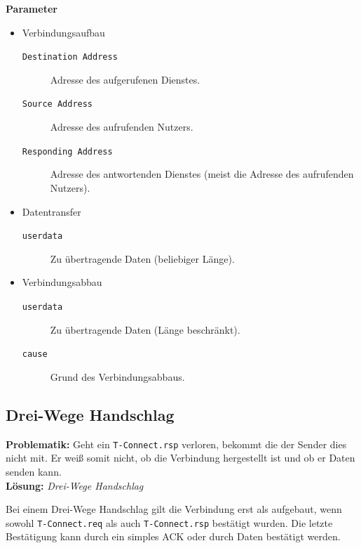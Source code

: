 \documentclass[a4paper, 11pt, accentcolor = tud3b]{tudreport}
\begin{document}
	            \textbf{Parameter}
	            \begin{itemize}
	            	\item Verbindungsaufbau
		            	\begin{description}
		            		\item[\texttt{Destination Address}] Adresse des aufgerufenen Dienstes.
		            		\item[\texttt{Source Address}] Adresse des aufrufenden Nutzers.
		            		\item[\texttt{Responding Address}] Adresse des antwortenden Dienstes (meist die Adresse des aufrufenden Nutzers).
		            	\end{description}
	            	\item Datentransfer
		            	\begin{description}
		            		\item[\texttt{userdata}] Zu übertragende Daten (beliebiger Länge).
	            		\end{description}
	            	\item Verbindungsabbau
		            	\begin{description}
		            		\item[\texttt{userdata}] Zu übertragende Daten (Länge beschränkt).
		            		\item[\texttt{cause}] Grund des Verbindungsabbaus.
	            		\end{description}
	            \end{itemize}

            \subsection{Drei-Wege Handschlag} %
	            \textbf{Problematik:} Geht ein \texttt{T-Connect.rsp} verloren, bekommt die der Sender dies nicht mit. Er weiß somit nicht, ob die Verbindung hergestellt ist und ob er Daten senden kann. \\
	            \textbf{Lösung:} \textit{Drei-Wege Handschlag}
	            
	            Bei einem Drei-Wege Handschlag gilt die Verbindung erst als aufgebaut, wenn sowohl \texttt{T-Connect.req} als auch \texttt{T-Connect.rsp} bestätigt wurden. Die letzte Bestätigung kann durch ein simples ACK oder durch Daten bestätigt werden.
	            
\end{document}
